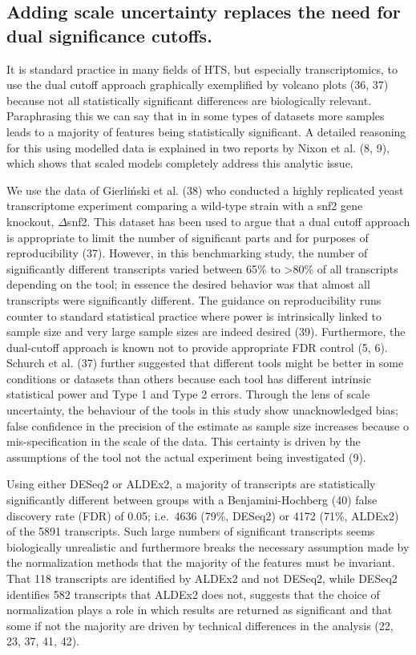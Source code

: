 \documentclass[
]{article}
\begin{document}
\subsection{Adding scale uncertainty replaces the need for dual
significance
cutoffs.}\label{adding-scale-uncertainty-replaces-the-need-for-dual-significance-cutoffs.}

It is standard practice in many fields of HTS, but especially
transcriptomics, to use the dual cutoff approach graphically exemplified
by volcano plots (36, 37) because not all statistically significant
differences are biologically relevant. Paraphrasing this we can say that
in in some types of datasets more samples leads to a majority of
features being statistically significant. A detailed reasoning for this
using modelled data is explained in two reports by Nixon et al. (8, 9),
which shows that scaled models completely address this analytic issue.

We use the data of Gierliński et al. (38) who conducted a highly
replicated yeast transcriptome experiment comparing a wild-type strain
with a snf2 gene knockout, \(\Delta\)snf2. This dataset has been used to
argue that a dual cutoff approach is appropriate to limit the number of
significant parts and for purposes of reproducibility (37). However, in
this benchmarking study, the number of significantly different
transcripts varied between 65\% to \textgreater80\% of all transcripts
depending on the tool; in essence the desired behavior was that almost
all transcripts were significantly different. The guidance on
reproducibility runs counter to standard statistical practice where
power is intrinsically linked to sample size and very large sample sizes
are indeed desired (39). Furthermore, the dual-cutoff approach is known
not to provide appropriate FDR control (5, 6). Schurch et al. (37)
further suggested that different tools might be better in some
conditions or datasets than others because each tool has different
intrinsic statistical power and Type 1 and Type 2 errors. Through the
lens of scale uncertainty, the behaviour of the tools in this study show
unacknowledged bias; false confidence in the precision of the estimate
as sample size increases because o mis-specification in the scale of the
data. This certainty is driven by the assumptions of the tool not the
actual experiment being investigated (9).

Using either DESeq2 or ALDEx2, a majority of transcripts are
statistically significantly different between groups with a
Benjamini-Hochberg (40) false discovery rate (FDR) of 0.05; i.e.~4636
(79\%, DESeq2) or 4172 (71\%, ALDEx2) of the 5891 transcripts. Such
large numbers of significant transcripts seems biologically unrealistic
and furthermore breaks the necessary assumption made by the
normalization methods that the majority of the features must be
invariant. That 118 transcripts are identified by ALDEx2 and not DESeq2,
while DESeq2 identifies 582 transcripts that ALDEx2 does not, suggests
that the choice of normalization plays a role in which results are
returned as significant and that some if not the majority are driven by
technical differences in the analysis (22, 23, 37, 41, 42).
\end{document}
